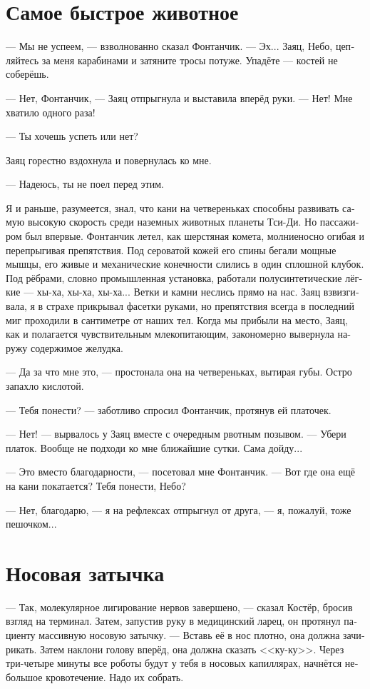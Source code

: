 \documentclass[a4paper,12pt,fleqn]{book}\usepackage{polyglossia}\setdefaultlanguage[babelshorthands=true]{russian}\setotherlanguage{english}\defaultfontfeatures{Ligatures=TeX,Mapping=tex-text}\usepackage{xcolor}\newcommand{\ml}[3]{#2}
\begin{document}
{\section{Самое быстрое животное}

--- Мы не успеем, --- взволнованно сказал Фонтанчик.
--- Эх...
Заяц, Небо, цепляйтесь за меня карабинами и затяните тросы потуже.
Упадёте --- костей не соберёшь.

--- Нет, Фонтанчик, --- Заяц отпрыгнула и выставила вперёд руки.
--- Нет!
Мне хватило одного раза!

--- Ты хочешь успеть или нет?

Заяц горестно вздохнула и повернулась ко мне.

--- Надеюсь, ты не поел перед этим.

Я и раньше, разумеется, знал, что кани на четвереньках способны развивать самую высокую скорость среди наземных животных планеты Тси-Ди.
Но пассажиром был впервые.
Фонтанчик летел, как шерстяная комета, молниеносно огибая и перепрыгивая препятствия.
Под сероватой кожей его спины бегали мощные мышцы, его живые и механические конечности слились в один сплошной клубок.
Под рёбрами, словно промышленная установка, работали полусинтетические лёгкие --- хы-ха, хы-ха, хы-ха...
Ветки и камни неслись прямо на нас.
Заяц взвизгивала, я в страхе прикрывал фасетки руками, но препятствия всегда в последний миг проходили в сантиметре от наших тел.
Когда мы прибыли на место, Заяц, как и полагается чувствительным млекопитающим, закономерно вывернула наружу содержимое желудка.

--- Да за что мне это, --- простонала она на четвереньках, вытирая губы.
Остро запахло кислотой.

--- Тебя понести? --- заботливо спросил Фонтанчик, протянув ей платочек.

--- Нет! --- вырвалось у Заяц вместе с очередным рвотным позывом.
--- Убери платок.
Вообще не подходи ко мне ближайшие сутки.
Сама дойду...

--- Это вместо благодарности, --- посетовал мне Фонтанчик.
--- Вот где она ещё на кани покатается?
Тебя понести, Небо?

--- Нет, благодарю, --- я на рефлексах отпрыгнул от друга, --- я, пожалуй, тоже пешочком...

\section{Носовая затычка}

--- Так, молекулярное лигирование нервов завершено, --- сказал Костёр, бросив взгляд на терминал. 
Затем, запустив руку в медицинский ларец, он протянул пациенту массивную носовую затычку.
--- Вставь её в нос плотно, она должна зачирикать.
Затем наклони голову вперёд, она должна сказать <<ку-ку>>.
Через три-четыре минуты все роботы будут у тебя в носовых капиллярах, начнётся небольшое кровотечение.
Надо их собрать.

}
\end{document}
